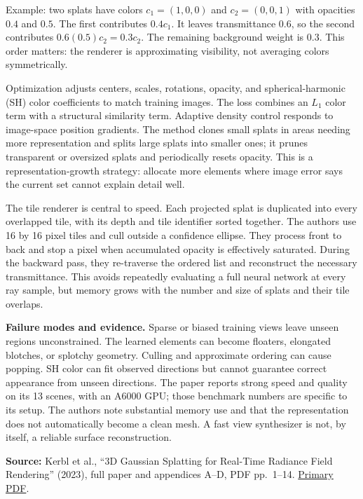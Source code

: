 Example: two splats have colors \(c_1=(1,0,0)\) and \(c_2=(0,0,1)\) with opacities \(0.4\) and \(0.5\). The first contributes \(0.4c_1\). It leaves transmittance \(0.6\), so the second contributes \(0.6(0.5)c_2=0.3c_2\). The remaining background weight is \(0.3\). This order matters: the renderer is approximating visibility, not averaging colors symmetrically.

Optimization adjusts centers, scales, rotations, opacity, and spherical-harmonic (SH) color coefficients to match training images. The loss combines an \(L_1\) color term with a structural similarity term. Adaptive density control responds to image-space position gradients. The method clones small splats in areas needing more representation and splits large splats into smaller ones; it prunes transparent or oversized splats and periodically resets opacity. This is a representation-growth strategy: allocate more elements where image error says the current set cannot explain detail well.

The tile renderer is central to speed. Each projected splat is duplicated into every overlapped tile, with its depth and tile identifier sorted together. The authors use 16 by 16 pixel tiles and cull outside a confidence ellipse. They process front to back and stop a pixel when accumulated opacity is effectively saturated. During the backward pass, they re-traverse the ordered list and reconstruct the necessary transmittance. This avoids repeatedly evaluating a full neural network at every ray sample, but memory grows with the number and size of splats and their tile overlaps.

\textbf{Failure modes and evidence.} Sparse or biased training views leave unseen regions unconstrained. The learned elements can become floaters, elongated blotches, or splotchy geometry. Culling and approximate ordering can cause popping. SH color can fit observed directions but cannot guarantee correct appearance from unseen directions. The paper reports strong speed and quality on its 13 scenes, with an A6000 GPU; those benchmark numbers are specific to its setup. The authors note substantial memory use and that the representation does not automatically become a clean mesh. A fast view synthesizer is not, by itself, a reliable surface reconstruction.

\textbf{Source:} Kerbl et al., ``3D Gaussian Splatting for Real-Time Radiance Field Rendering'' (2023), full paper and appendices A--D, PDF pp.~1--14. \href{https://repo-sam.inria.fr/fungraph/3d-gaussian-splatting/3d_gaussian_splatting_low.pdf}{Primary PDF}.

